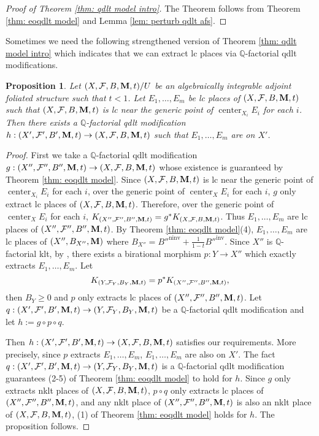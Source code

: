 \documentclass[12pt]{amsart}
\numberwithin{equation}{section}
\newcommand{\Mm}{{\bf{M}}}
\newcommand{\Qq}{\mathbb{Q}}
\newcommand{\Center}{\operatorname{center}}
\newcommand{\ninv}{\operatorname{ninv}}
\newcommand{\inv}{\operatorname{inv}}
\newcommand{\Ff}{\mathcal{F}}
\newtheorem{prop}[thm]{Proposition}
\theoremstyle{definition}
\theoremstyle{definition}
\theoremstyle{definition}
\begin{document}
\begin{proof}[Proof of Theorem \ref{thm: qdlt model intro}]
    The Theorem follows from Theorem \ref{thm: eoqdlt model} and Lemma \ref{lem: perturb qdlt afs}.
\end{proof}


Sometimes we need the following strengthened version of  Theorem \ref{thm: qdlt model intro} which indicates that we can extract lc places via $\Qq$-factorial qdlt modifications.

\begin{prop}\label{prop: qdlt model extract certain divisors}
Let $(X,\Ff,B,\Mm,t)/U$ be an algebraically integrable adjoint foliated structure such that $t<1$. Let $E_1,\dots,E_m$ be lc places of $(X,\Ff,B,\Mm,t)$ such that $(X,\Ff,B,\Mm,t)$ is lc near the generic point of $\Center_{X_i}E_i$ for each $i$. Then there exists a $\Qq$-factorial qdlt modification $h: (X',\Ff',B',\Mm,t)\rightarrow (X,\Ff,B,\Mm,t)$ such that $E_1,\dots,E_m$ are on $X'$.
\end{prop}
\begin{proof}
First we take a $\Qq$-factorial qdlt modification $g: (X'',\Ff'',B'',\Mm,t)\rightarrow (X,\Ff,B,\Mm,t)$ whose existence is guaranteed by Theorem \ref{thm: eoqdlt model}. Since $(X,\Ff,B,\Mm,t)$ is lc near the generic point of $\Center_{X_i}E_i$ for each $i$, over the generic point of $\Center_XE_i$ for each $i$, $g$ only extract lc places of $(X,\Ff,B,\Mm,t)$. Therefore, over the generic point of $\Center_XE_i$ for each $i$, $K_{(X'',\Ff'',B'',\Mm,t)}=g^*K_{(X,\Ff,B,\Mm,t)}$. Thus $E_1,\dots,E_m$ are lc places of $(X'',\Ff'',B'',\Mm,t)$. By Theorem \ref{thm: eoqdlt model}(4), $E_1,\dots,E_m$ are lc places of $(X'',B_{X''},\Mm)$ where $B_{X''}=B''^{\ninv}+\frac{1}{1-t}B''^{\inv}$. Since $X''$ is $\Qq$-factorial klt, by \cite[Corollary 1.4.3]{BCHM10}, there exists a birational morphism $p: Y\rightarrow X''$ which exactly extracts $E_1,\dots,E_m$. Let 
$$K_{(Y,\Ff_Y,B_Y,\Mm,t)}=p^*K_{(X'',\Ff'',B'',\Mm,t)},$$
then $B_Y\geq 0$ and $p$ only extracts lc places of $(X'',\Ff'',B'',\Mm,t)$. Let $q: (X',\Ff',B',\Mm,t)\rightarrow (Y,\Ff_Y,B_Y,\Mm,t)$ be a $\Qq$-factorial qdlt modification and let $h:=g\circ p\circ q$. 

Then $h: (X',\Ff',B',\Mm,t)\rightarrow (X,\Ff,B,\Mm,t)$ satisfies our requirements. More precisely, since $p$ extracts $E_1,\dots,E_m$, $E_1,\dots,E_m$ are also on $X'$. The fact  $q: (X',\Ff',B',\Mm,t)\rightarrow (Y,\Ff_Y,B_Y,\Mm,t)$ is a $\Qq$-factorial qdlt modification guarantees (2-5) of Theorem \ref{thm: eoqdlt model} to hold for $h$. Since $g$ only extracts nklt places of $(X,\Ff,B,\Mm,t)$, $p\circ q$ only extracts lc places of $(X'',\Ff'',B'',\Mm,t)$, and any nklt place of $(X'',\Ff'',B'',\Mm,t)$ is also an nklt place of $(X,\Ff,B,\Mm,t)$, (1) of Theorem \ref{thm: eoqdlt model}  holds for $h$. The proposition follows.
\end{proof}
\end{document}
